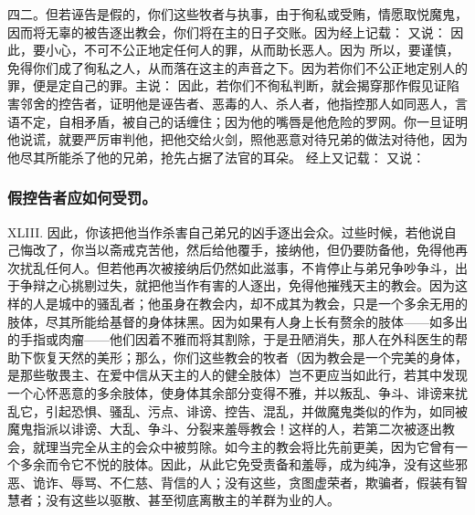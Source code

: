 四二。但若诬告是假的，你们这些牧者与执事，由于徇私或受贿，情愿取悦魔鬼，因而将无辜的被告逐出教会，你们将在主的日子交账。因为经上记载：  又说： 因此，要小心，不可不公正地定任何人的罪，从而助长恶人。因为 所以，要谨慎，免得你们成了徇私之人，从而落在这主的声音之下。因为若你们不公正地定别人的罪，便是定自己的罪。主说： 因此，若你们不徇私判断，就会揭穿那作假见证陷害邻舍的控告者，证明他是诬告者、恶毒的人、杀人者，他指控那人如同恶人，言语不定，自相矛盾，被自己的话缠住；因为他的嘴唇是他危险的罗网。你一旦证明他说谎，就要严厉审判他，把他交给火剑，照他恶意对待兄弟的做法对待他，因为他尽其所能杀了他的兄弟，抢先占据了法官的耳朵。 经上又记载： 又说：\par


\subsubsection{假控告者应如何受罚。}

XLIII. 因此，你该把他当作杀害自己弟兄的凶手逐出会众。过些时候，若他说自己悔改了，你当以斋戒克苦他，然后给他覆手，接纳他，但仍要防备他，免得他再次扰乱任何人。但若他再次被接纳后仍然如此滋事，不肯停止与弟兄争吵争斗，出于争辩之心挑剔过失，就把他当作有害的人逐出，免得他摧残天主的教会。因为这样的人是城中的骚乱者；他虽身在教会内，却不成其为教会，只是一个多余无用的肢体，尽其所能给基督的身体抹黑。因为如果有人身上长有赘余的肢体——如多出的手指或肉瘤——他们因着不雅而将其割除，于是丑陋消失，那人在外科医生的帮助下恢复天然的美形；那么，你们这些教会的牧者（因为教会是一个完美的身体，是那些敬畏主、在爱中信从天主的人的健全肢体）岂不更应当如此行，若其中发现一个心怀恶意的多余肢体，使身体其余部分变得不雅，并以叛乱、争斗、诽谤来扰乱它，引起恐惧、骚乱、污点、诽谤、控告、混乱，并做魔鬼类似的作为，如同被魔鬼指派以诽谤、大乱、争斗、分裂来羞辱教会！这样的人，若第二次被逐出教会，就理当完全从主的会众中被剪除。如今主的教会将比先前更美，因为它曾有一个多余而令它不悦的肢体。因此，从此它免受责备和羞辱，成为纯净，没有这些邪恶、诡诈、辱骂、不仁慈、背信的人；没有这些，贪图虚荣者，欺骗者，假装有智慧者；没有这些以驱散、甚至彻底离散主的羊群为业的人。\par

